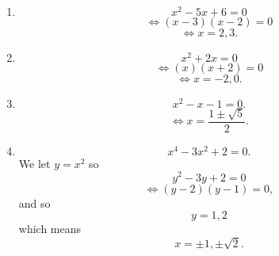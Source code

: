 \begin{enumerate}
\item
\[
x^2 - 5x + 6 = 0
\]
\[
\iff (x-3)(x-2) = 0
\]
\[
\iff x = 2,3.
\]
\item
\[
x^2 + 2x = 0
\]
\[
\iff (x)(x+2) = 0
\]
\[
\iff x = -2, 0.
\]
\item
\[
x^2 - x -1 = 0.
\]
\[
\iff x = \frac{1\pm\sqrt{5}}{2}.
\]
\item
\[
x^4 - 3x^2 + 2 = 0.
\]
We let $y = x^2$ so
\[
y^2 -3y + 2 = 0
\]
\[
\iff (y-2)(y-1) = 0,
\]
and so
\[
y = 1,2
\]
which means
\[
x = \pm 1, \pm \sqrt{2}.
\]
\end{enumerate}